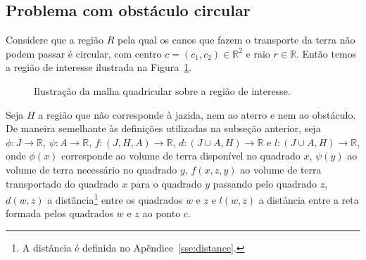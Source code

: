 \subsection{Problema com obstáculo circular}
Considere que a região $R$ pela qual os canos que fazem o transporte da terra
não podem passar é circular, com centro $c = (c_1, c_2) \in \mathbb{R}^2$ e raio
$r \in \mathbb{R}$. Então temos a região de interesse ilustrada na
Figura~\ref{fig:disc_J_A_R}.
\begin{figure}[!htb]
    \centering
    \caption{Ilustra\c{c}\~{a}o da malha quadricular sobre a regi\~{a}o de
    interesse.}
    \label{fig:disc_J_A_R}
\end{figure}

Seja $H$ a região que não corresponde \`{a} jazida, nem ao aterro e nem ao
obstáculo. De maneira semelhante \`{a}s definições utilizadas na subseção
anterior, seja $\phi: J \to \mathbb{R}$, $\psi: A \to \mathbb{R}$,
$f: (J, H, A) \to \mathbb{R}$, $d: (J \cup A, H) \to \mathbb{R}$ e $l:
(J \cup A, H) \to \mathbb{R}$, onde $\phi(x)$ corresponde ao volume de terra
disponível no quadrado $x$, $\psi(y)$ ao volume de terra necessário no quadrado
$y$, $f(x, z, y)$ ao volume de terra transportado do quadrado $x$ para o
quadrado $y$ passando pelo quadrado $z$, $d(w, z)$ a distância\footnote{A
distância é definida no Apêndice~\ref{sse:distance}.} entre os
quadrados $w$ e $z$ e $l(w, z)$ a distância entre a reta
formada pelos quadrados $w$ e $z$ ao ponto $c$.

